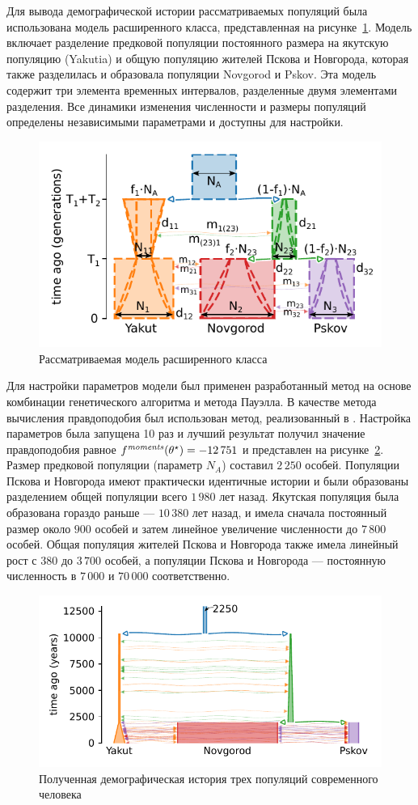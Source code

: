 Для вывода демографической истории рассматриваемых популяций была использована модель расширенного класса, представленная на рисунке~\ref{fig:part2:experiments:rus:model}.
Модель включает разделение предковой популяции постоянного размера на якутскую популяцию (Yakutia) и общую популяцию жителей Пскова и Новгорода, которая также разделилась и образовала популяции Novgorod и Pskov.
Эта модель содержит три элемента временных интервалов, разделенные двумя элементами разделения.
Все динамики изменения численности и размеры популяций определены независимыми параметрами и доступны для настройки.

\begin{figure}[ht]
    \centering
        \includegraphics[width=0.6\linewidth]{images_experiments/rus_genomes/picture_1pop_model_2.pdf}
    \caption{Рассматриваемая модель расширенного класса}
    \label{fig:part2:experiments:rus:model}
\end{figure}

Для настройки параметров модели был применен разработанный метод на основе комбинации генетического алгоритма и метода Пауэлла.
В качестве метода вычисления правдоподобия был использован метод, реализованный в \moments.
Настройка параметров была запущена 10 раз и лучший результат получил значение правдоподобия равное $f^\text{\textit{moments}}(\theta^\star) = -12{\,}751$ и представлен на рисунке~\ref{fig:part2:experiments:rus:result}.
Размер предковой популяции (параметр $N_A$) составил $2{\,}250$ особей.
Популяции Пскова и Новгорода имеют практически идентичные истории и были образованы разделением общей популяции всего $1{\,}980$ лет назад.
Якутская популяция была образована гораздо раньше --- $10{\,}380$ лет назад, и имела сначала постоянный размер около $900$  особей и затем линейное увеличение численности до $7{\,}800$ особей.
Общая популяция жителей Пскова и Новгорода также имела линейный рост с $380$ до $3{\,}700$ особей, а популяции Пскова и Новгорода --- постоянную численность в $7{\,}000$ и $70{\,}000$ соответственно.

\begin{figure}[ht]
    \centering
        \includegraphics[width=0.6\linewidth]{images_experiments/rus_genomes/picture_result.pdf}
    \caption{Полученная демографическая история трех популяций современного человека}
    \label{fig:part2:experiments:rus:result}
\end{figure}

